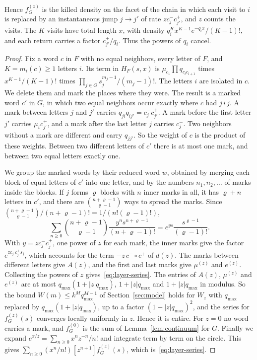 Hence $f^{(z)}_G$ is the killed density on the facet of the chain in which each visit to $i$ is
replaced by an instantaneous jump $j\to j'$ of rate $zc^-_jc^+_{j'}$, and $z$ counts the
visits. The $K$ visits have total length $x$, with density $q_i^Kx^{K-1}e^{-q_ix}/(K-1)!$,
and each return carries a factor $c^+_{j'}/q_i$. Thus the powers of $q_i$ cancel.

\begin{proof}
Fix a word $c$ in $F$ with no equal neighbors, every letter of $F$, and $K=m_i(c)\ge1$
letters $i$. Its term in $H_F(s,x)$ is $\mu_{c_1}\prod q_{c_lc_{l+1}}$ times
$x^{K-1}/(K-1)!$ times $\prod_{j\in G}s_j^{m_j-1}/(m_j-1)!$. The letters $i$ are isolated in
$c$. We delete them and mark the places where they were. The result is a marked word $c'$ in
$G$, in which two equal neighbors occur exactly where $c$ had $j\,i\,j$. A mark between
letters $j$ and $j'$ carries $q_{ji}q_{ij'}=c^-_jc^+_{j'}$. A mark before the first letter $j'$
carries $\mu_ic^+_{j'}$, and a mark after the last letter $j$ carries $c^-_j$. Two neighbors
without a mark are different and carry $q_{jj'}$. So the weight of $c$ is the product of these
weights. Between two different letters of $c'$ there is at most one mark, and between two
equal letters exactly one.

We group the marked words by their reduced word $w$, obtained by merging each block of equal
letters of $c'$ into one letter, and by the numbers $n_1,n_2,\dots$ of marks inside the
blocks. If $j$ forms $\varrho$ blocks with $n$ inner marks in all, it has $\varrho+n$ letters
in $c'$, and there are $\binom{n+\varrho-1}{\varrho-1}$ ways to spread the marks. Since
$\binom{n+\varrho-1}{\varrho-1}/(n+\varrho-1)!=1/(n!(\varrho-1)!)$,
\[
\sum_{n\ge0}\binom{n+\varrho-1}{\varrho-1}\frac{y^ns^{n+\varrho-1}}{(n+\varrho-1)!}=e^{ys}\frac{s^{\varrho-1}}{(\varrho-1)!}.
\]
With $y=zc^-_jc^+_j$, one power of $z$ for each mark, the inner marks give the factor
$e^{zc^-_jc^+_js_j}$, which accounts for the term $-z\,c^-\circ c^+$ of $d(z)$. The marks between different
letters give $A(z)$, and the first and last marks give $\mu^{(z)}$ and $e^{(z)}$. Collecting
the powers of $z$ gives~\eqref{eq:layer-series}. The entries of $A(z)$, $\mu^{(z)}$ and
$e^{(z)}$ are at most $q_{\max}(1+|z|q_{\max})$, $1+|z|q_{\max}$ and $1+|z|q_{\max}$ in
modulus. So the bound $W(m)\le k^Mq_{\max}^{M-1}$ of Section~\ref{sec:model} holds for $W_z$
with $q_{\max}$ replaced by $q_{\max}(1+|z|q_{\max})$, up to a factor $(1+|z|q_{\max})^2$, and
the series for $f^{(z)}_G(s)$ converges locally uniformly in $z$. Hence it is entire. For
$z=0$ no word carries a mark, and $f^{(0)}_G$ is the sum of Lemma~\ref{lem:continuum} for $G$.
Finally we expand $e^{x/z}=\sum_{n\ge0}x^nz^{-n}/n!$ and integrate term by term on the circle.
This gives $\sum_{n\ge0}(x^n/n!)[z^{n+1}]f^{(z)}_G(s)$, which is~\eqref{eq:layer-series}.
\end{proof}

